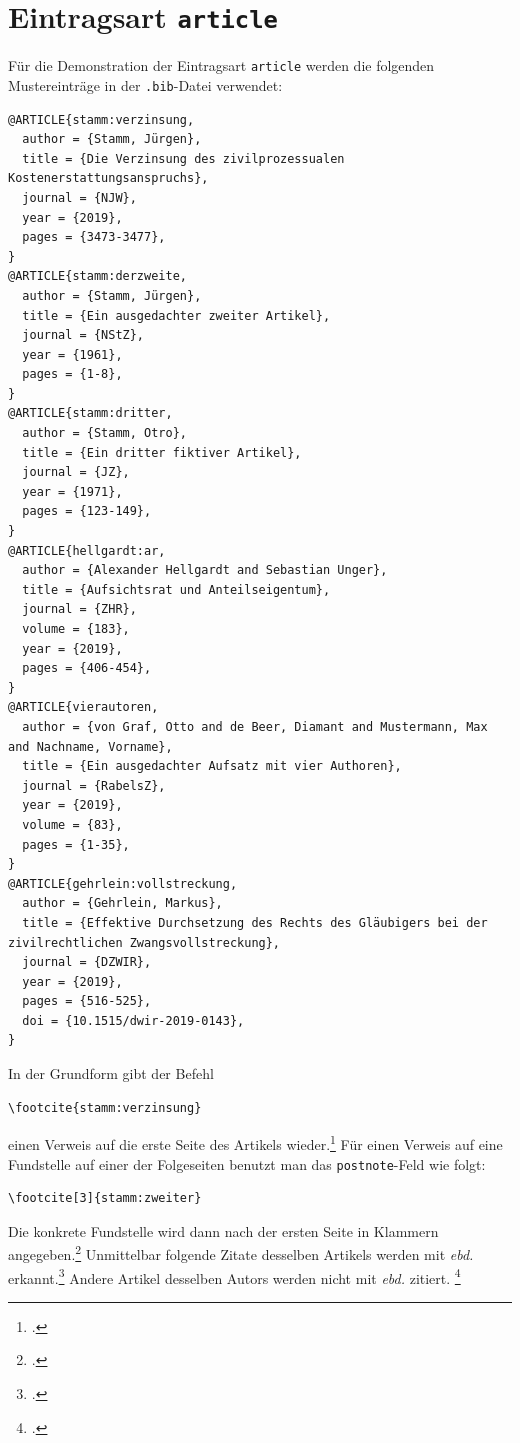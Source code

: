 \documentclass[headings=small,numbers=noenddot, 12pt,oneside]{scrartcl}
\begin{document}
\section{Eintragsart \texttt{article}}
Für die Demonstration der Eintragsart \texttt{article} werden  die folgenden Mustereinträge in der \texttt{.bib}-Datei verwendet: 
\begin{verbatim}
@ARTICLE{stamm:verzinsung,
  author = {Stamm, Jürgen},
  title = {Die Verzinsung des zivilprozessualen Kostenerstattungsanspruchs},
  journal = {NJW},
  year = {2019},
  pages = {3473-3477},
}
@ARTICLE{stamm:derzweite,
  author = {Stamm, Jürgen},
  title = {Ein ausgedachter zweiter Artikel},
  journal = {NStZ},
  year = {1961},
  pages = {1-8},
}
@ARTICLE{stamm:dritter,
  author = {Stamm, Otro},
  title = {Ein dritter fiktiver Artikel},
  journal = {JZ},
  year = {1971},
  pages = {123-149},
}
@ARTICLE{hellgardt:ar,
  author = {Alexander Hellgardt and Sebastian Unger},
  title = {Aufsichtsrat und Anteilseigentum},
  journal = {ZHR},
  volume = {183},
  year = {2019},
  pages = {406-454},
}
@ARTICLE{vierautoren,
  author = {von Graf, Otto and de Beer, Diamant and Mustermann, Max and Nachname, Vorname},
  title = {Ein ausgedachter Aufsatz mit vier Authoren},
  journal = {RabelsZ},
  year = {2019},
  volume = {83},
  pages = {1-35},
}
@ARTICLE{gehrlein:vollstreckung,
  author = {Gehrlein, Markus},
  title = {Effektive Durchsetzung des Rechts des Gläubigers bei der zivilrechtlichen Zwangsvollstreckung},
  journal = {DZWIR},
  year = {2019},
  pages = {516-525},
  doi = {10.1515/dwir-2019-0143},
}
\end{verbatim}
In der Grundform gibt der Befehl
\begin{verbatim}
\footcite{stamm:verzinsung}
\end{verbatim}
einen Verweis auf die erste Seite des Artikels wieder.\footcite{stamm:verzinsung} Für einen Verweis auf eine Fundstelle auf einer der Folgeseiten benutzt man das \texttt{postnote}-Feld wie folgt:
\begin{verbatim}
\footcite[3]{stamm:zweiter}
\end{verbatim}
Die konkrete Fundstelle wird dann nach der ersten Seite in Klammern angegeben.\footcite[3]{stamm:zweiter} Unmittelbar folgende Zitate desselben Artikels werden mit \textit{ebd.} erkannt.\footcite[4]{stamm:zweiter} Andere Artikel desselben Autors werden nicht mit \textit{ebd.} zitiert. \footcite[3474]{stamm:verzinsung}
\end{document}
